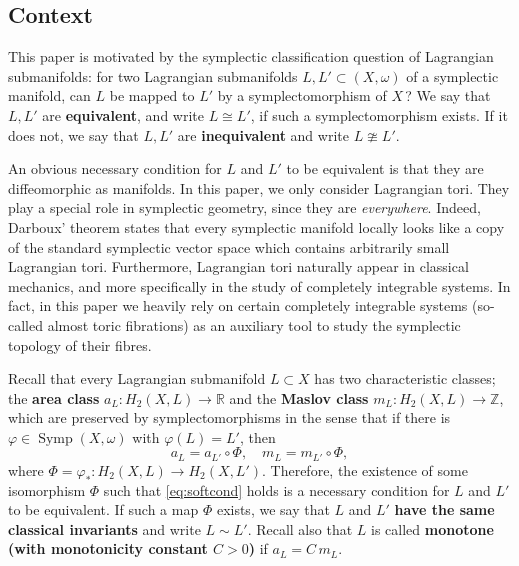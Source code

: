 \documentclass[12pt,a4paper,abstract=true,draft]{scrartcl}
\begin{document}
\subsection{Context}
\label{sec:intro_context}

This paper is motivated by the symplectic classification question of Lagrangian submanifolds: for two Lagrangian submanifolds $L,L' \subset (X,\omega)$ of a symplectic manifold, can $L$ be mapped to $L'$ by a symplectomorphism of $X\,$? We say that $L,L'$ are \textbf{equivalent}, and write $L \cong L'$, if such a symplectomorphism exists.
If it does not, we say that $L,L'$ are \textbf{inequivalent} and write $L \ncong L'$. 

An obvious necessary condition for $L$ and $L'$ to be equivalent is that they are diffeomorphic as manifolds.
In this paper, we only consider Lagrangian tori.
They play a special role in symplectic geometry, since they are \emph{everywhere}.
Indeed, Darboux' theorem states that every symplectic manifold locally looks like a copy of the standard symplectic vector space which contains arbitrarily small Lagrangian tori.
Furthermore, Lagrangian tori naturally appear in classical mechanics, and more specifically in the study of completely integrable systems.
In fact, in this paper we heavily rely on certain completely integrable systems (so-called almost toric fibrations) as an auxiliary tool to study the symplectic topology of their fibres.

Recall that every Lagrangian submanifold $L \subset X$ has two characteristic classes; the  \textbf{area class} $a_L \colon H_2(X,L) \rightarrow \mathbb{R}$ and the \textbf{Maslov class} $m_L \colon H_2(X,L) \rightarrow \mathbb{Z}$, which are preserved by symplectomorphisms in the sense that if there is $φ \in \operatorname{Symp}(X,\omega)$ with $φ(L) = L'$, then 
\begin{equation}
    \label{eq:softcond}
    a_{L} = a_{L'} \circ Φ, \quad
    m_{L} = m_{L'} \circ Φ, 
\end{equation}
where $Φ = φ_* \colon H_2(X,L) \rightarrow H_2(X,L')$.
Therefore, the existence of some isomorphism $Φ$ such that \eqref{eq:softcond} holds is a necessary condition for $L$ and $L'$ to be equivalent.
If such a map $Φ$ exists, we say that $L$ and $L'$ \textbf{have the same classical invariants} and write $L \sim L'$.
Recall also that $L$ is called \textbf{monotone (with monotonicity constant $C > 0$)} if $a_L = C \, m_L$. 
\end{document}
